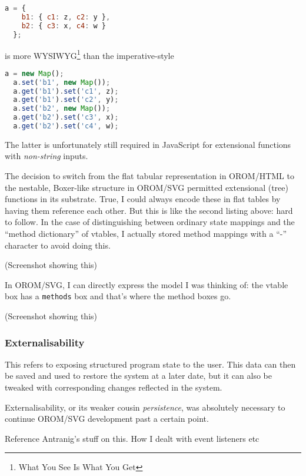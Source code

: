 \documentclass[english,submission]{programming}
\begin{document}
  \begin{lstlisting}[language=JavaScript]
  a = {
    b1: { c1: z, c2: y },
    b2: { c3: x, c4: w }
  };
  \end{lstlisting}

  is more WYSIWYG\footnote{What You See Is What You Get} than the
  imperative-style

  \begin{lstlisting}[language=JavaScript]
  a = new Map();
  a.set('b1', new Map());
  a.get('b1').set('c1', z);
  a.get('b1').set('c2', y);
  a.set('b2', new Map());
  a.get('b2').set('c3', x);
  a.get('b2').set('c4', w);
  \end{lstlisting}

  The latter is unfortunately still required in JavaScript for extensional
  functions with \emph{non-string} inputs.

  The decision to switch from the flat tabular representation in OROM/HTML
  to the nestable, Boxer-like structure in OROM/SVG permitted extensional
  (tree) functions in its substrate. True, I could always encode these in
  flat tables by having them reference each other. But this is like the
  second listing above: hard to follow. In the case of distinguishing
  between ordinary state mappings and the ``method dictionary'' of
  vtables, I actually stored method mappings with a ``-'' character to
  avoid doing this.

  (Screenshot showing this)

  In OROM/SVG, I can directly express the model I was thinking of: the
  vtable box has a \texttt{methods} box and that's where the method boxes
  go.

  (Screenshot showing this)

  \hypertarget{externalisability}{%
  \subsubsection{Externalisability}\label{externalisability}}

  This refers to exposing structured program state to the user. This data
  can then be saved and used to restore the system at a later date, but it
  can also be tweaked with corresponding changes reflected in the system.

  Externalisability, or its weaker cousin \emph{persistence}, was
  absolutely necessary to continue OROM/SVG development past a certain
  point.

  Reference Antranig's stuff on this. How I dealt with event listeners etc
\end{document}
